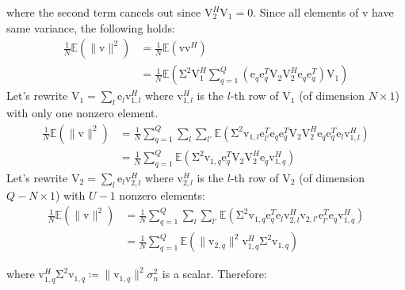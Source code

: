 \documentclass[journal,comsoc]{IEEEtran}
\newcommand{\vect}[1]{\boldsymbol{\mathrm{#1}}}
\newcommand{\mat}[1]{\boldsymbol{\mathrm{#1}}}
\begin{document}
where the second term cancels out since $\mat{V}_2^H \mat{V}_1=\mat{0}$. Since all elements of $\vect{v}$ have same variance, the following holds:
\begin{equation}
	\begin{split}
	\frac{1}{N}\mathbb{E}\left(\|\vect{v}\|^2\right)&=\frac{1}{N}\mathbb{E}\left(\vect{v}\vect{v}^H\right) \\
	&=\frac{1}{N}\mathbb{E} \left( \mat{\Sigma}^2\mat{V}_1^H  \sum_{q=1}^Q\left(\vect{e}_q \vect{e}_q^T \mat{V}_2 \mat{V}_2^H \vect{e}_{q} \vect{e}_{q}^T\right)\mat{V}_1 \right)
	\end{split}
\end{equation}
Let's rewrite $\mat{V}_1=\sum_{l}\vect{e}_{l}\vect{v}_{1,l}^H$ where $\vect{v}_{1,l}^H$ is the $l$-th row of $\mat{V}_1$ (of dimension $N\times 1$) with only one nonzero element.
\begin{equation}
	\begin{split}
	\frac{1}{N}\mathbb{E}\left(\|\vect{v}\|^2\right)&=\frac{1}{N}\sum_{q=1}^Q\sum_{l}\sum_{l'}\mathbb{E} \left( \mat{\Sigma}^2\vect{v}_{1,l}\vect{e}_{l'}^T  \vect{e}_q \vect{e}_q^T \mat{V}_2 \mat{V}_2^H \vect{e}_{q} \vect{e}_{q}^T\vect{e}_{l}\vect{v}_{1,l}^H \right)\\
	&=\frac{1}{N}\sum_{q=1}^Q \mathbb{E} \left( \mat{\Sigma}^2\vect{v}_{1,q}\vect{e}_q^T \mat{V}_2 \mat{V}_2^H \vect{e}_{q} \vect{v}_{1,q}^H \right)
	\end{split}
\end{equation}
Let's rewrite $\mat{V}_2=\sum_{l}\vect{e}_{l}\vect{v}_{2,l}^H$ where $\vect{v}_{2,l}^H$ is the $l$-th row of $\mat{V}_2$ (of dimension $Q-N\times 1$) with $U-1$ nonzero elements:
\begin{equation}
	\begin{split}
	\frac{1}{N}\mathbb{E}\left(\|\vect{v}\|^2\right)&=\frac{1}{N}\sum_{q=1}^Q\sum_l\sum_{l'} \mathbb{E} \left( \mat{\Sigma}^2\vect{v}_{1,q}\vect{e}_q^T \vect{e}_{l}\vect{v}_{2,l}^H \vect{v}_{2,l'} \vect{e}_{l'}^T \vect{e}_{q} \vect{v}_{1,q}^H \right)\\
	&=\frac{1}{N}\sum_{q=1}^Q \mathbb{E} \left( \| \vect{v}_{2,q}\|^2\vect{v}_{1,q}^H\mat{\Sigma}^2\vect{v}_{1,q}  \right)
	\end{split}
\end{equation}

where $\vect{v}_{1,q}^H \mat{\Sigma}^2 \vect{v}_{1,q} \coloneqq  \| \vect{v}_{1,q}\|^2 \sigma_n^2$ is a scalar. Therefore:
\end{document}
